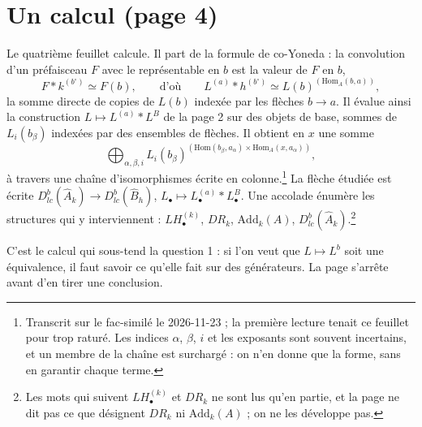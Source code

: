 \documentclass[11pt,a4paper]{article}
\begin{document}
\section*{Un calcul (page 4)}

Le quatrième feuillet calcule. Il part de la formule de co-Yoneda : la
convolution d'un préfaisceau $F$ avec le représentable en $b$ est la valeur de
$F$ en $b$,
\[
F * k^{(b^{\circ})} \simeq F(b),
\qquad\text{d'où}\qquad
L^{(a)} * h^{(b^{\circ})} \simeq L(b)^{(\mathrm{Hom}_{A}(b, a))},
\]
la somme directe de copies de $L(b)$ indexée par les flèches $b \to a$. Il
évalue ainsi la construction $L \mapsto L^{(a)} * L^{B}$ de la page 2 sur des
objets de base, sommes de $L_{i}(b_{\beta})$ indexées par des ensembles de
flèches. Il obtient en $x$ une somme
\[
\bigoplus_{\alpha, \beta, i} L_{i}(b_{\beta})^{(\mathrm{Hom}(b_{\beta}, a_{\alpha})
\times \mathrm{Hom}_{A}(x, a_{\alpha}))},
\]
à travers une chaîne d'isomorphismes écrite en colonne.\footnote{Transcrit sur
le fac-similé le 2026-11-23 ; la première lecture tenait ce feuillet pour trop
raturé. Les indices $\alpha$, $\beta$, $i$ et les exposants sont souvent
incertains, et un membre de la chaîne est surchargé : on n'en donne que la
forme, sans en garantir chaque terme.} La flèche étudiée est écrite
$D^{b}_{lc}(\hat{A}_{k}) \to D^{b}_{lc}(\hat{B}_{h})$,
$L_{\bullet} \mapsto L_{\bullet}^{(a)} * L_{\bullet}^{B}$. Une accolade énumère
les structures qui y interviennent : $LH_{\bullet}^{(k)}$, $DR_{k}$,
$\mathrm{Add}_{k}(A)$, $D^{b}_{lc}(\hat{A}_{k})$.\footnote{Les mots qui suivent
$LH_{\bullet}^{(k)}$ et $DR_{k}$ ne sont lus qu'en partie, et la page ne dit pas
ce que désignent $DR_{k}$ ni $\mathrm{Add}_{k}(A)$ ; on ne les développe pas.}

C'est le calcul qui sous-tend la question 1 : si l'on veut que
$L \mapsto L^{b}$ soit une équivalence, il faut savoir ce qu'elle fait sur des
générateurs. La page s'arrête avant d'en tirer une conclusion.
\end{document}
